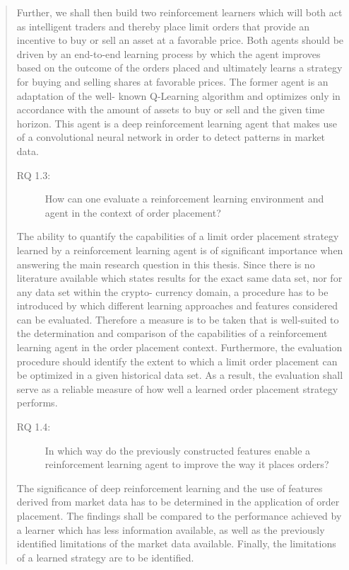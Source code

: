 \begin{quote}
    Further, we shall then build two reinforcement learners which will both act as intelligent traders and thereby place limit orders that provide an incentive to buy or sell an asset at a favorable price.
    Both agents should be driven by an end-to-end learning process by which the agent improves based on the outcome of the orders placed and ultimately learns a strategy for  buying and selling shares at favorable prices.
    The former agent is an adaptation of the well- known Q-Learning algorithm and optimizes only in accordance with the amount of assets to buy or sell and the given time horizon.
    This agent is a deep reinforcement learning agent that makes use of a convolutional neural network in order to detect patterns in market data.

\begin{description}
    \item[RQ 1.3:] How can one evaluate a reinforcement learning environment and agent in the context of order placement?
\end{description}
    The ability to quantify the capabilities of a limit order placement strategy learned by a reinforcement learning agent is of significant importance when answering the main research question in this thesis.
    Since there is no literature available which states results for the exact same data set, nor for any data set within the crypto- currency domain, a procedure has to be introduced by which different learning approaches and features considered can be evaluated.
    Therefore a measure is to be taken that is well-suited to the determination and comparison of the capabilities of a reinforcement learning agent in the order placement context.
    Furthermore, the evaluation procedure should identify the extent to which a limit order placement can be optimized in a given historical data set.
    As a result, the evaluation shall serve as a reliable measure of how well a learned order placement strategy performs.
    
\begin{description}
    \item[RQ 1.4:] In which way do the previously constructed features enable a reinforcement learning agent to improve the way it places orders?
\end{description}

    The significance of deep reinforcement learning and the use of features derived from market data has to be determined in the application of order placement.
    The findings shall be compared to the performance achieved by a learner which has less information available, as well as the previously identified limitations of the market data available.
    Finally, the limitations of a learned strategy are to be identified.
\end{quote}


